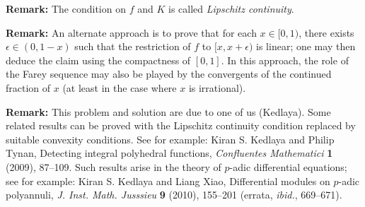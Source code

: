 \documentclass[amssymb,twocolumn,pra,10pt,aps]{revtex4-1}
\begin{document}
\begin{itemize}
\noindent
\textbf{Remark:}
The condition on $f$ and $K$ is called \emph{Lipschitz continuity}.

\noindent
\textbf{Remark:}
An alternate approach is to prove that for each $x  \in [0,1)$, there exists $\epsilon  \in (0, 1-x)$ such that the restriction of $f$ to $[x, x+\epsilon)$ is linear;
one may then deduce the claim using the compactness of $[0,1]$. In this approach, the role of the Farey sequence may also be played by the convergents of the continued fraction of $x$ (at least in the case where $x$ is irrational).

\noindent
\textbf{Remark:} This problem and solution are due to one of us (Kedlaya). Some related results can be proved with the Lipschitz continuity condition replaced by suitable convexity conditions.
 See for example: Kiran S. Kedlaya and Philip Tynan,
Detecting integral polyhedral functions, \textit{Confluentes Mathematici}
\textbf{1} (2009), 87--109.
Such results arise in the theory of $p$-adic differential equations; see for example:
Kiran S. Kedlaya and Liang Xiao, Differential modules on $p$-adic polyannuli, \textit{J. Inst. Math. Jusssieu} \textbf{9} (2010), 155--201 (errata, \textit{ibid.}, 669--671).

\end{itemize}
\end{document}
